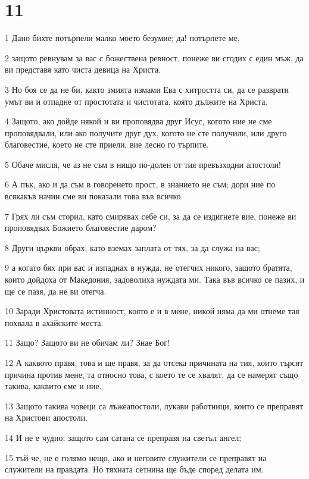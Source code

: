 \chapter{11}

\par 1 Дано бихте потърпели малко моето безумие; да! потърпете ме,
\par 2 защото ревнувам за вас с божествена ревност, понеже ви сгодих с един мъж, да ви представя като чиста девица на Христа.
\par 3 Но боя се да не би, както змията измами Ева с хитростта си, да се разврати умът ви и отпадне от простотата и чистотата, която дължите на Христа.
\par 4 Защото, ако дойде някой и ви проповядва друг Исус, когото ние не сме проповядвали, или ако получите друг дух, когото не сте получили, или друго благовестие, което не сте приели, вие лесно го търпите.
\par 5 Обаче мисля, че аз не съм в нищо по-долен от тия превъзходни апостоли!
\par 6 А пък, ако и да съм в говоренето прост, в знанието не съм; дори ние по всякакъв начин сме ви показали това във всичко.
\par 7 Грях ли съм сторил, като смирявах себе си, за да се издигнете вие, понеже ви проповядвах Божието благовестие даром?
\par 8 Други църкви обрах, като вземах заплата от тях, за да служа на вас;
\par 9 а когато бях при вас и изпаднах в нужда, не отегчих никого, защото братята, които дойдоха от Македония, задоволиха нуждата ми. Така във всичко се пазих, и ще се пазя, да не ви отегча.
\par 10 Заради Христовата истинност, която е и в мене, никой няма да ми отнеме тая похвала в ахайските места.
\par 11 Защо? Защото ви не обичам ли? Знае Бог!
\par 12 А каквото правя, това и ще правя, за да отсека причината на тия, които търсят причина против мене, та относно това, с което те се хвалят, да се намерят също такива, каквито сме и ние.
\par 13 Защото такива човеци са лъжеапостоли, лукави работници, които се преправят на Христови апостоли.
\par 14 И не е чудно; защото сам сатана се преправя на светъл ангел;
\par 15 тъй че, не е голямо нещо, ако и неговите служители се преправят на служители на правдата. Но тяхната сетнина ще бъде според делата им.
